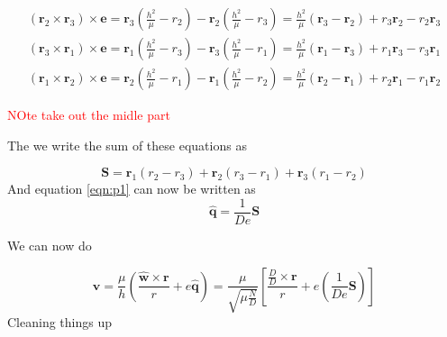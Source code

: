 \documentclass[12pt]{article}
\begin{document}
	\begin{eqnarray}
	\left( \mathbf { r } _ { 2 } \times \mathbf { r } _ { 3 } \right) \times \mathbf { e } = \mathbf { r } _ { 3 } \left( \frac { h ^ { 2 } } { \mu } - r _ { 2 } \right) - \mathbf { r } _ { 2 } \left( \frac { h ^ { 2 } } { \mu } - r _ { 3 } \right) = \frac { h ^ { 2 } } { \mu } \left( \mathbf { r } _ { 3 } - \mathbf { r } _ { 2 } \right) + r _ { 3 } \mathbf { r } _ { 2 } - r _ { 2 } \mathbf { r } _ { 3 }\\
	\left( \mathbf { r } _ { 3 } \times \mathbf { r } _ { 1 } \right) \times \mathbf { e } = \mathbf { r } _ { 1 } \left( \frac { h ^ { 2 } } { \mu } - r _ { 3 } \right) - \mathbf { r } _ { 3 } \left( \frac { h ^ { 2 } } { \mu } - r _ { 1 } \right) = \frac { h ^ { 2 } } { \mu } \left( \mathbf { r } _ { 1 } - \mathbf { r } _ { 3 } \right) + r _ { 1 } \mathbf { r } _ { 3 } - r _ { 3 } \mathbf { r } _ { 1 }\\
	\left( \mathbf { r } _ { 1 } \times \mathbf { r } _ { 2 } \right) \times \mathbf { e } = \mathbf { r } _ { 2 } \left( \frac { h ^ { 2 } } { \mu } - r _ { 1 } \right) - \mathbf { r } _ { 1 } \left( \frac { h ^ { 2 } } { \mu } - r _ { 2 } \right) = \frac { h ^ { 2 } } { \mu } \left( \mathbf { r } _ { 2 } - \mathbf { r } _ { 1 } \right) + r _ { 2 } \mathbf { r } _ { 1 } - r _ { 1 } \mathbf { r } _ { 2 }
	\end{eqnarray}
	
\textcolor{red}{	NOte take out the midle part}

The we write the sum of these equations as 

	\begin{equation}
	\mathbf { S } = \mathbf { r } _ { 1 } \left( r _ { 2 } - r _ { 3 } \right) + \mathbf { r } _ { 2 } \left( r _ { 3 } - r _ { 1 } \right) + \mathbf { r } _ { 3 } \left( r _ { 1 } - r _ { 2 } \right)
	\end{equation}
	And equation \ref{eqn:p1} can now be written as 
	\begin{equation}
	\hat { \mathbf { q } } = \frac { 1 } { D e } \mathbf { S }
	\end{equation}
	
	We can now do
	
	\begin{equation}
	\mathbf { v } = \frac { \mu } { h } \left( \frac { \hat { \mathbf { w } } \times \mathbf { r } } { r } + e \hat { \mathbf { q } } \right)=\frac { \mu } { \sqrt { \mu \frac { N } { D } } } \left[ \frac { \frac { D } { D } \times \mathbf { r } } { r } + e \left( \frac { 1 } { D e } \mathbf { S } \right) \right]
	\end{equation}
	Cleaning things up
	
\end{document}
